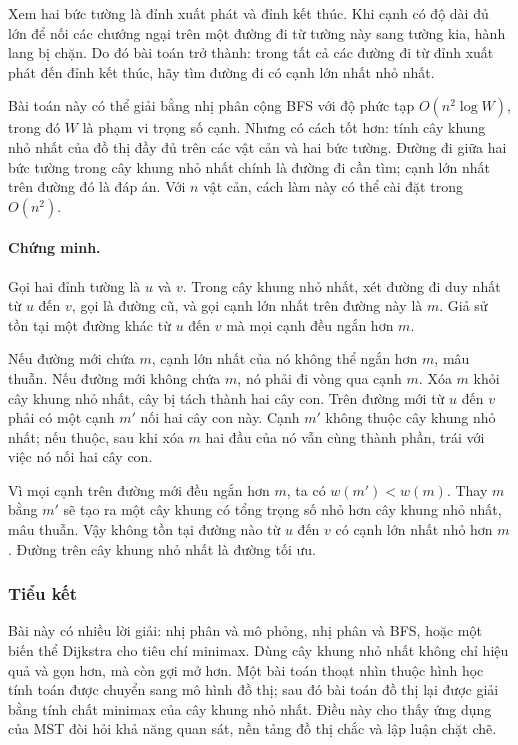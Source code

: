 \documentclass[11pt]{article}
\begin{document}
Xem hai bức tường là đỉnh xuất phát và đỉnh kết thúc. Khi cạnh có độ dài đủ
lớn để nối các chướng ngại trên một đường đi từ tường này sang tường kia,
hành lang bị chặn. Do đó bài toán trở thành: trong tất cả các đường đi từ
đỉnh xuất phát đến đỉnh kết thúc, hãy tìm đường đi có cạnh lớn nhất nhỏ nhất.

Bài toán này có thể giải bằng nhị phân cộng BFS với độ phức tạp
$O(n^2\log W)$, trong đó $W$ là phạm vi trọng số cạnh. Nhưng có cách tốt hơn:
tính cây khung nhỏ nhất của đồ thị đầy đủ trên các vật cản và hai bức tường.
Đường đi giữa hai bức tường trong cây khung nhỏ nhất chính là đường đi cần
tìm; cạnh lớn nhất trên đường đó là đáp án. Với $n$ vật cản, cách làm này có
thể cài đặt trong $O(n^2)$.

\paragraph{Chứng minh.}
Gọi hai đỉnh tường là $u$ và $v$. Trong cây khung nhỏ nhất, xét đường đi duy
nhất từ $u$ đến $v$, gọi là đường cũ, và gọi cạnh lớn nhất trên đường này là
$m$. Giả sử tồn tại một đường khác từ $u$ đến $v$ mà mọi cạnh đều ngắn hơn
$m$.

Nếu đường mới chứa $m$, cạnh lớn nhất của nó không thể ngắn hơn $m$, mâu
thuẫn. Nếu đường mới không chứa $m$, nó phải đi vòng qua cạnh $m$. Xóa $m$
khỏi cây khung nhỏ nhất, cây bị tách thành hai cây con. Trên đường mới từ
$u$ đến $v$ phải có một cạnh $m'$ nối hai cây con này. Cạnh $m'$ không thuộc
cây khung nhỏ nhất; nếu thuộc, sau khi xóa $m$ hai đầu của nó vẫn cùng thành
phần, trái với việc nó nối hai cây con.

Vì mọi cạnh trên đường mới đều ngắn hơn $m$, ta có $w(m')<w(m)$. Thay $m$
bằng $m'$ sẽ tạo ra một cây khung có tổng trọng số nhỏ hơn cây khung nhỏ nhất,
mâu thuẫn. Vậy không tồn tại đường nào từ $u$ đến $v$ có cạnh lớn nhất nhỏ hơn
$m$. Đường trên cây khung nhỏ nhất là đường tối ưu.

\subsubsection*{Tiểu kết}

Bài này có nhiều lời giải: nhị phân và mô phỏng, nhị phân và BFS, hoặc một
biến thể Dijkstra cho tiêu chí minimax. Dùng cây khung nhỏ nhất không chỉ hiệu
quả và gọn hơn, mà còn gợi mở hơn. Một bài toán thoạt nhìn thuộc hình học tính
toán được chuyển sang mô hình đồ thị; sau đó bài toán đồ thị lại được giải
bằng tính chất minimax của cây khung nhỏ nhất. Điều này cho thấy ứng dụng của
MST đòi hỏi khả năng quan sát, nền tảng đồ thị chắc và lập luận chặt chẽ.
\end{document}

